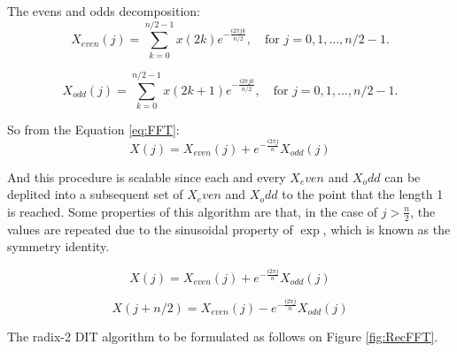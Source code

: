 {The evens and odds decomposition:
\begin{equation}
    X_{even}(j) = \sum_{k=0}^{n/2-1} x(2k) e^{ - \frac{i 2\pi jk}{n/2} }, \quad \text{for } j = 0,1,\dots,n/2-1.
\end{equation}

\begin{equation}
    X_{odd}(j) =  \sum_{k=0}^{n/2-1} x(2k+1) e^{ - \frac{i 2\pi jk}{n/2} }, \quad \text{for } j = 0,1,\dots,n/2-1.
\end{equation}

So from the Equation \eqref{eq:FFT}:
\begin{equation}
    X(j) =  X_{even}(j) + e^{- \frac{i 2\pi j}{n}} X_{odd}(j)
\end{equation}

And this procedure is scalable since each and every \( X_even \) and \( X_odd \) can be deplited into a subsequent set of \( X_even \) and \( X_odd \) to the point that the length 1 is reached. Some properties of this algorithm are that, in the case of \( j > \frac{n}{2} \), the values are repeated due to the sinusoidal property of \( \exp \), which is known as the symmetry identity.

\begin{equation}
    X(j) =  X_{even}(j) + e^{- \frac{i 2\pi j}{n}} X_{odd}(j)
\end{equation}

\begin{equation}
    X(j+n/2) =  X_{even}(j) - e^{- \frac{i 2\pi j}{n}} X_{odd}(j)
\end{equation}

The radix-2 DIT algorithm to be formulated as follows on Figure \ref{fig:RecFFT}. 


\begin{figure}[h]
    \centering
\end{figure}}

